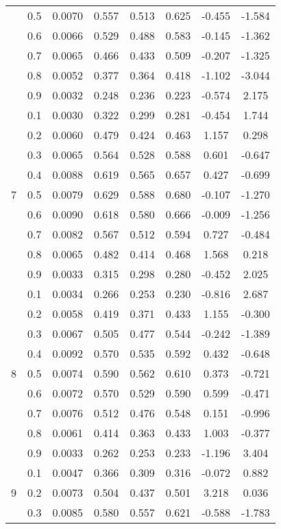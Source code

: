 \documentclass[11pt,a4paper]{report}
\begin{document}
\begin{longtable}{ | c | c || c | c | c | c | c | c | }
 & 0.5 & 0.0070 & 0.557 & 0.513 & 0.625 & -0.455 & -1.584 \\
 & 0.6 & 0.0066 & 0.529 & 0.488 & 0.583 & -0.145 & -1.362 \\
 & 0.7 & 0.0065 & 0.466 & 0.433 & 0.509 & -0.207 & -1.325 \\
 & 0.8 & 0.0052 & 0.377 & 0.364 & 0.418 & -1.102 & -3.044 \\
 & 0.9 & 0.0032 & 0.248 & 0.236 & 0.223 & -0.574 & 2.175 \\
 \hline
\multirow{9}{*}{7} & 0.1 & 0.0030 & 0.322 & 0.299 & 0.281 & -0.454 & 1.744 \\
 & 0.2 & 0.0060 & 0.479 & 0.424 & 0.463 & 1.157 & 0.298 \\
 & 0.3 & 0.0065 & 0.564 & 0.528 & 0.588 & 0.601 & -0.647 \\
 & 0.4 & 0.0088 & 0.619 & 0.565 & 0.657 & 0.427 & -0.699 \\
 & 0.5 & 0.0079 & 0.629 & 0.588 & 0.680 & -0.107 & -1.270 \\
 & 0.6 & 0.0090 & 0.618 & 0.580 & 0.666 & -0.009 & -1.256 \\
 & 0.7 & 0.0082 & 0.567 & 0.512 & 0.594 & 0.727 & -0.484 \\
 & 0.8 & 0.0065 & 0.482 & 0.414 & 0.468 & 1.568 & 0.218 \\
 & 0.9 & 0.0033 & 0.315 & 0.298 & 0.280 & -0.452 & 2.025 \\
 \hline
\multirow{9}{*}{8} & 0.1 & 0.0034 & 0.266 & 0.253 & 0.230 & -0.816 & 2.687 \\
 & 0.2 & 0.0058 & 0.419 & 0.371 & 0.433 & 1.155 & -0.300 \\
 & 0.3 & 0.0067 & 0.505 & 0.477 & 0.544 & -0.242 & -1.389 \\
 & 0.4 & 0.0092 & 0.570 & 0.535 & 0.592 & 0.432 & -0.648 \\
 & 0.5 & 0.0074 & 0.590 & 0.562 & 0.610 & 0.373 & -0.721 \\
 & 0.6 & 0.0072 & 0.570 & 0.529 & 0.590 & 0.599 & -0.471 \\
 & 0.7 & 0.0076 & 0.512 & 0.476 & 0.548 & 0.151 & -0.996 \\
 & 0.8 & 0.0061 & 0.414 & 0.363 & 0.433 & 1.003 & -0.377 \\
 & 0.9 & 0.0033 & 0.262 & 0.253 & 0.233 & -1.196 & 3.404 \\
 \hline
\multirow{9}{*}{9} & 0.1 & 0.0047 & 0.366 & 0.309 & 0.316 & -0.072 & 0.882 \\
 & 0.2 & 0.0073 & 0.504 & 0.437 & 0.501 & 3.218 & 0.036 \\
 & 0.3 & 0.0085 & 0.580 & 0.557 & 0.621 & -0.588 & -1.783 \\

\end{longtable}
\end{document}
